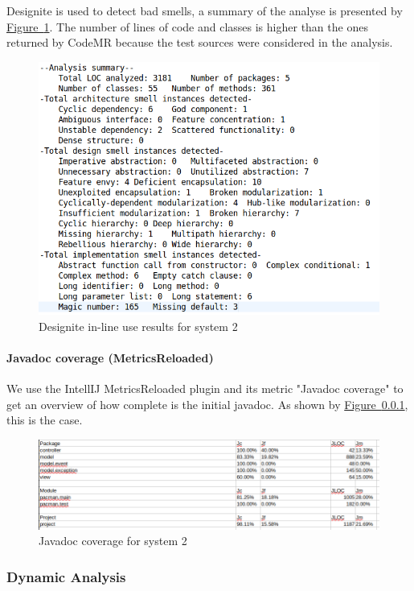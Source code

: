 \documentclass[]{article}
\newcommand{\wordlink}[2]{\hyperref[#2]{#1~\ref{#2}}}
\begin{document}
\vspace{0.1cm}

Designite is used to detect bad smells, a summary of the analyse is presented by \wordlink{Figure}{fig:S2_designite}. The number of lines of code and classes is higher than the ones returned by CodeMR because the test sources were considered in the analysis.

\begin{figure}[h]
\centering
\includegraphics[width=0.65\linewidth]{S2-designite}
\caption{Designite in-line use results for system 2}
\label{fig:S2_designite}
\end{figure}


\newpage


\paragraph{Javadoc coverage (MetricsReloaded)}

We use the IntellIJ MetricsReloaded plugin and its metric "Javadoc coverage" to get an overview of how complete is the initial javadoc. As shown by \wordlink{Figure}{}, this is the case.

\vspace{0.2cm}

\begin{figure}[h]
\centering
\includegraphics[width=0.65\linewidth]{S2-javadoc}
\caption{Javadoc coverage for system 2}
\label{fig:S2_javadoc}
\end{figure}

\subsubsection{Dynamic Analysis}
\end{document}
